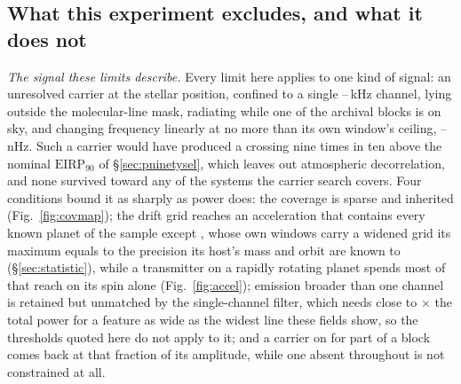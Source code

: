 \subsection{What this experiment excludes, and what it does not}
\label{sec:excludes}

\noindent\emph{The signal these limits describe.} Every limit here applies to
one kind of signal: an unresolved carrier at the stellar position, confined to
a single \ChanLoA--\ChanHiA\,kHz channel, lying outside the molecular-line
mask, radiating while one of the archival blocks is on sky, and changing
frequency linearly at no more than its own window's ceiling,
\DriftCeilLo--\DriftCeilHi\,nHz. Such a carrier would have produced a crossing
nine times in ten above the nominal $\mathrm{EIRP}_{90}$ of
\S\ref{sec:pninetysel}, which leaves out atmospheric decorrelation, and none
survived toward any of the \NSysClassA{} systems the carrier search covers.
Four conditions bound it as sharply as power does: the coverage is sparse and
inherited (Fig.~\ref{fig:covmap}); the drift grid reaches an acceleration that
contains every known planet of the sample except \AccelWorstName, whose own
windows carry a widened grid its maximum equals to the precision its host's
mass and orbit are known to (\S\ref{sec:statistic}), while a transmitter on a
rapidly rotating planet spends most of that reach on its spin alone
(Fig.~\ref{fig:accel}); emission broader than one channel is retained but
unmatched by the single-channel filter, which needs close to
\ScNBroadRatio$\times$ the total power for a feature as wide as the widest line
these fields show, so the thresholds quoted here do not apply to it; and a
carrier on for part of a block comes back at that fraction of its amplitude,
while one absent throughout is not constrained at all.


